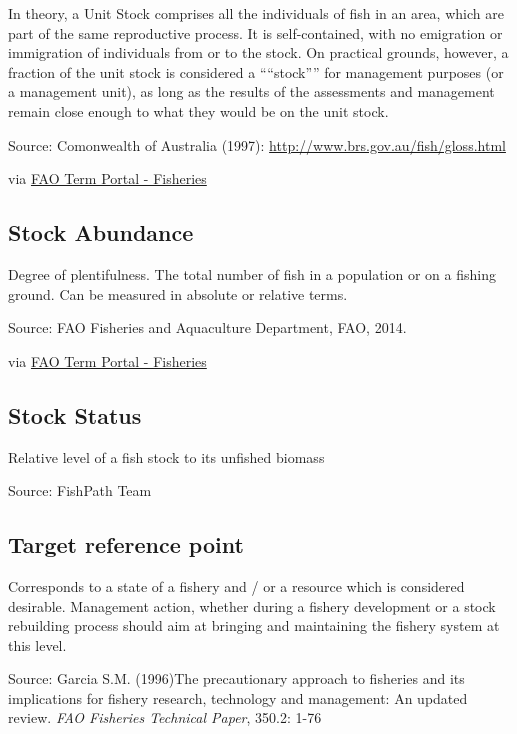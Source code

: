 \documentclass[
  11pt,
]{book}
\begin{document}
In theory, a Unit Stock comprises all the individuals of fish in an area, which are part of the same reproductive process. It is self-contained, with no emigration or immigration of individuals from or to the stock. On practical grounds, however, a fraction of the unit stock is considered a ````stock'''' for management purposes (or a management unit), as long as the results of the assessments and management remain close enough to what they would be on the unit stock.

Source: Comonwealth of Australia (1997): \url{http://www.brs.gov.au/fish/gloss.html}

via \href{http://www.fao.org/fishery/glossary/en}{FAO Term Portal - Fisheries}

\hypertarget{stock-abundance}{%
\subsection{Stock Abundance}\label{stock-abundance}}

Degree of plentifulness. The total number of fish in a population or on a fishing ground. Can be measured in absolute or relative terms.

Source: FAO Fisheries and Aquaculture Department, FAO, 2014.

via \href{http://www.fao.org/fishery/glossary/en}{FAO Term Portal - Fisheries}

\hypertarget{stock-status}{%
\subsection{Stock Status}\label{stock-status}}

Relative level of a fish stock to its unfished biomass

Source: FishPath Team

\hypertarget{target-reference-point}{%
\subsection{Target reference point}\label{target-reference-point}}

Corresponds to a state of a fishery and / or a resource which is considered desirable. Management action, whether during a fishery development or a stock rebuilding process should aim at bringing and maintaining the fishery system at this level.

Source: Garcia S.M. (1996)The precautionary approach to fisheries and its implications for fishery research, technology and management: An updated review. \emph{FAO Fisheries Technical Paper}, 350.2: 1-76
\end{document}
